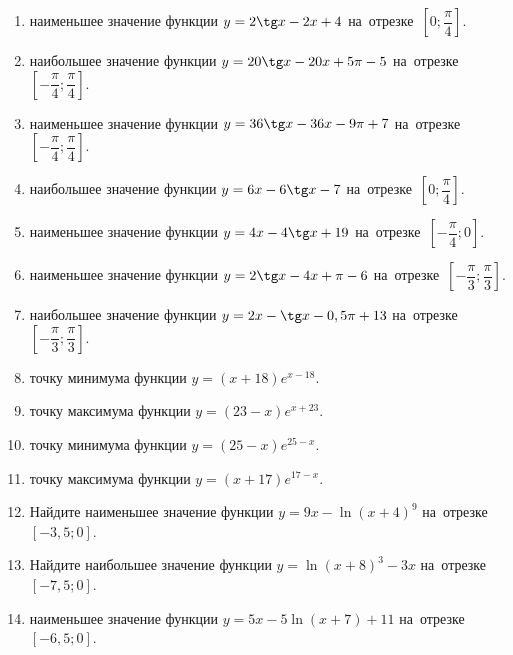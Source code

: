 \documentclass[a4paper,10pt]{article}
\begin{document}
\begin{enumerate}
\item {} наименьшее значение функции $y=2\tg x-2x+4$ на~отрезке~$\left[0;\dfrac{\pi }{4}\right]$.

\item {} наибольшее значение функции $y=20\tg x-20x+5\pi -5$ на~отрезке~$\left[-\dfrac{\pi }{4};\dfrac{\pi }{4}\right]$.

\item {} наименьшее значение функции $y=36\tg x-36x-9\pi +7$ на~отрезке~$\left[-\dfrac{\pi }{4};\dfrac{\pi }{4}\right]$.

\item {} наибольшее значение функции $y=6x-6\tg x-7$ на~отрезке~$\left[0;\dfrac{\pi }{4}\right]$.

\item {} наименьшее значение функции $y=4x-4\tg x+19$ на~отрезке~$\left[-\dfrac{\pi }{4};0\right]$.

\item {} наименьшее значение функции $y=2\tg x-4x+\pi -6$ на~отрезке~$\left[-\dfrac{\pi }{3};\dfrac{\pi }{3}\right]$.

\item {} наибольшее значение функции $y=2x-\tg x-0,5\pi +13$ на~отрезке~$\left[-\dfrac{\pi }{3};\dfrac{\pi }{3}\right]$.

\item {} точку минимума функции $y=\left(x+18\right)e^{x-18}$.

\item {} точку максимума функции $y=\left(23-x\right)e^{x+23}$.

\item {} точку минимума функции $y=\left(25-x\right)e^{25-x}$.

\item {} точку максимума функции $y=\left(x+17\right)e^{17-x}$.

\item Найдите наименьшее значение функции $y=9x-\ln \left(x+4\right)^9$ на~отрезке~$\left[-3,5;0\right]$.

\item Найдите наибольшее значение функции $y=\ln \left(x+8\right)^3-3x$ на~отрезке~$\left[-7,5;0\right]$.

\item {} наименьшее значение функции $y=5x-5\ln \left(x+7\right)+11$ на~отрезке~$\left[-6,5;0\right]$.


\end{enumerate}
\end{document}
